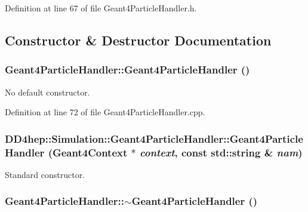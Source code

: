 Definition at line 67 of file Geant4ParticleHandler.h.

\subsection{Constructor \& Destructor Documentation}
\hypertarget{class_d_d4hep_1_1_simulation_1_1_geant4_particle_handler_a0de98b6650d1787bf26b6b959bc7e502}{
\subsubsection[{Geant4ParticleHandler}]{\setlength{\rightskip}{0pt plus 5cm}Geant4ParticleHandler::Geant4ParticleHandler ()}}
\label{class_d_d4hep_1_1_simulation_1_1_geant4_particle_handler_a0de98b6650d1787bf26b6b959bc7e502}


No default constructor. 

Definition at line 72 of file Geant4ParticleHandler.cpp.\hypertarget{class_d_d4hep_1_1_simulation_1_1_geant4_particle_handler_a71d231fc9a93ebe885e78377577acb34}{
\subsubsection[{Geant4ParticleHandler}]{\setlength{\rightskip}{0pt plus 5cm}DD4hep::Simulation::Geant4ParticleHandler::Geant4ParticleHandler ({\bf Geant4Context} $\ast$ {\em context}, \/  const std::string \& {\em nam})}}
\label{class_d_d4hep_1_1_simulation_1_1_geant4_particle_handler_a71d231fc9a93ebe885e78377577acb34}


Standard constructor. \hypertarget{class_d_d4hep_1_1_simulation_1_1_geant4_particle_handler_a38b97e54b48b0df16a7205a683a68180}{
\subsubsection[{$\sim$Geant4ParticleHandler}]{\setlength{\rightskip}{0pt plus 5cm}Geant4ParticleHandler::$\sim$Geant4ParticleHandler ()}}
\label{class_d_d4hep_1_1_simulation_1_1_geant4_particle_handler_a38b97e54b48b0df16a7205a683a68180}



